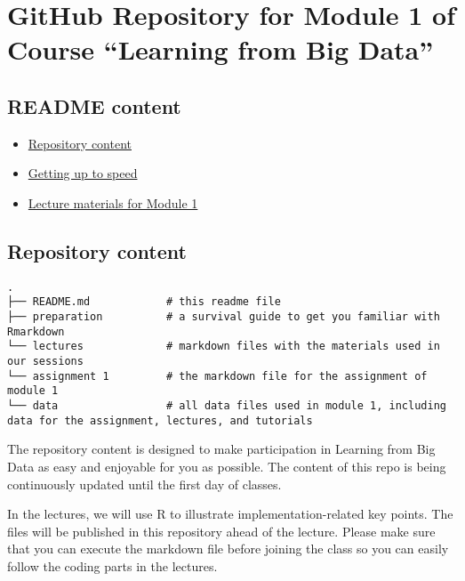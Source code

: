 \documentclass[
]{article}
\author{}
\date{\vspace{-2.5em}}
\providecommand{\tightlist}{%
  \setlength{\itemsep}{0pt}\setlength{\parskip}{0pt}}
\begin{document}
\hypertarget{github-repository-for-module-1-of-course-learning-from-big-data}{%
\section{GitHub Repository for Module 1 of Course ``Learning from Big
Data''}\label{github-repository-for-module-1-of-course-learning-from-big-data}}

\hypertarget{readme-content}{%
\subsection{README content}\label{readme-content}}

\begin{itemize}
\tightlist
\item
  \protect\hyperlink{repository-content}{Repository content}
\item
  \protect\hyperlink{Getting-up-to-speed}{Getting up to speed}
\item
  \protect\hyperlink{lecture-materials}{Lecture materials for Module 1}
\end{itemize}

\hypertarget{repository-content}{%
\subsection{Repository content}\label{repository-content}}

\begin{verbatim}
.
├── README.md            # this readme file
├── preparation          # a survival guide to get you familiar with Rmarkdown
└── lectures             # markdown files with the materials used in our sessions 
└── assignment 1         # the markdown file for the assignment of module 1 
└── data                 # all data files used in module 1, including data for the assignment, lectures, and tutorials
\end{verbatim}

The repository content is designed to make participation in Learning
from Big Data as easy and enjoyable for you as possible. The content of
this repo is being continuously updated until the first day of classes.

In the lectures, we will use R to illustrate implementation-related key
points. The files will be published in this repository ahead of the
lecture. Please make sure that you can execute the markdown file before
joining the class so you can easily follow the coding parts in the
lectures.
\end{document}

